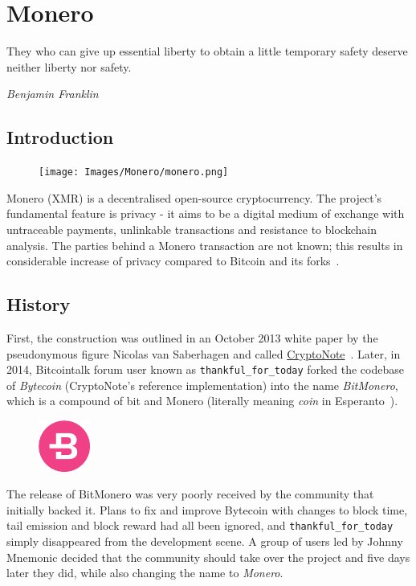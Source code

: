 \chapter{Monero} \label{sec:Monero}
%
\epigraph{They who can give up essential liberty to obtain a little temporary safety deserve neither liberty nor safety.}{\textit{Benjamin Franklin}}
%
\section{Introduction}
\begin{figure}
\centering
\texttt{[image: Images/Monero/monero.png]}
\end{figure}
Monero (XMR) is a decentralised open-source cryptocurrency. The project's fundamental feature is privacy - it aims to be a digital medium of exchange with untraceable payments, unlinkable transactions and resistance to blockchain analysis. The parties behind a Monero transaction are not known; this results in considerable increase of privacy compared to Bitcoin and its forks~\cite{monerodef}.

\section{History}
First, the construction was outlined in an October 2013 white paper by the pseudonymous figure Nicolas van Saberhagen and called \hyperref[sec:CryptoNote]{CryptoNote}~\cite{citeulike:14139412}. Later, in 2014, Bitcointalk forum user known as \verb|thankful_for_today| forked the codebase of \emph{Bytecoin} (CryptoNote's reference implementation) into the name \emph{BitMonero}, which is a compound of bit and Monero (literally meaning \emph{coin} in Esperanto~\cite{esperanto}).

\begin{figure}
\centering
\includegraphics[width=0.15\textwidth]{Images/Monero/bytecoin.png}
\end{figure}
The release of BitMonero was very poorly received by the community that initially backed it. Plans to fix and improve Bytecoin with changes to block time, tail emission and block reward had all been ignored, and \verb|thankful_for_today| simply disappeared from the development scene. A group of users led by Johnny Mnemonic decided that the community should take over the project and five days later they did, while also changing the name to \emph{Monero}.
\pagebreak

